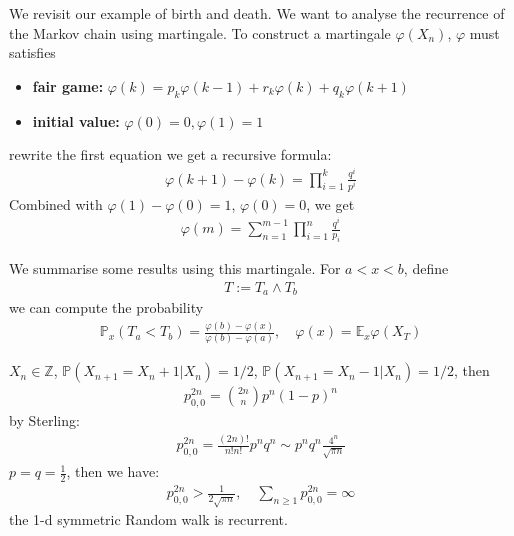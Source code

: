 \begin{example}
We revisit our example of birth and death. We want to analyse the recurrence of the Markov chain using martingale. To construct a martingale $\varphi(X_n)$, $\varphi$ must satisfies
\begin{itemize}
	\item \textbf{fair game:} $\varphi(k) = p_k\varphi(k-1) + r_k\varphi(k) + q_k\varphi(k+1)$
	\item \textbf{initial value:} $\varphi(0) = 0, \varphi(1) = 1$
\end{itemize}
rewrite the first equation we get a recursive formula:
\begin{align*}
	\varphi(k+1) - \varphi(k) = \prod_{i = 1}^k \frac{q^i}{p^i}
\end{align*}
Combined with $\varphi(1) - \varphi(0) = 1$, $\varphi(0) = 0$, we get
\begin{align*}
	\varphi(m) = \sum_{n = 1}^{m-1} \prod_{i= 1}^n \frac{q^i}{p_i}
\end{align*}
\end{example}

\begin{example}
We summarise some results using this martingale. For $a < x < b$, define
\begin{align*}
	T:= T_a \wedge T_b
\end{align*}
we can compute the probability 
\begin{align*}
	\mathbb{P}_x (T_a < T_b) = \frac{\varphi(b) - \varphi(x)}{\varphi(b) - \varphi(a)}, \quad \varphi(x) = \mathbb{E}_x \varphi(X_T)
\end{align*}
\end{example}

\begin{example}
	$X_n \in \mathbb{Z}$, $\mathbb{P}(X_{n+1} = X_n + 1|X_n) = 1\slash 2$,  $\mathbb{P}(X_{n+1} = X_n - 1|X_n) = 1\slash 2$, then
	\begin{align*}
		p_{0, 0}^{2n} = \binom{2n}{n} p^n(1-p)^n
	\end{align*}
	by Sterling:
	\begin{align*}
		p_{0, 0}^{2n} = \frac{(2n)!}{n!n!}p^n q^n \sim p^n q^n\frac{4^n}{\sqrt{\pi n}} 
	\end{align*}
	$p = q = \frac{1}{2}$, then we have:
	\begin{align*}
		 p_{0, 0}^{2n} > \frac{1}{2 \sqrt{\pi n}}, \quad  \sum_{n \geq 1} p_{0, 0}^{2n} = \infty
	\end{align*}
	the 1-d symmetric Random walk is recurrent.	
\end{example}



